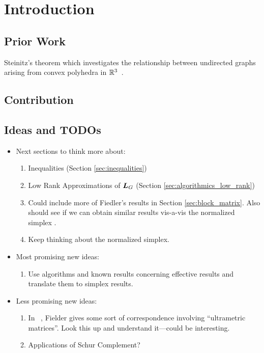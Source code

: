 \chapter{Introduction}
\label{chap:intro}



\section{Prior Work}
\label{chap:intro_prior_work}

Steinitz's theorem which investigates the relationship between undirected graphs arising from convex polyhedra in $\mathbb{R}^3$~\cite{steinitz1922polyeder}. 

\section{Contribution}
\label{chap:intro_contribution}


\section{Ideas and TODOs}
\begin{itemize}
	\item Next sections to think more about: 
	\begin{enumerate}
		\item Inequalities (Section \ref{sec:inequalities}) 
		\item Low Rank Approximations of $\vb*{L}_G$ (Section \ref{sec:algorithmics_low_rank})
		\item Could include more of Fiedler's results in Section \ref{sec:block_matrix}. Also should see if we can obtain  similar results vis-a-vis the normalized simplex . 
		\item Keep thinking about the normalized simplex. 
	\end{enumerate}
\item Most promising new ideas: 
\begin{enumerate}
	\item Use algorithms and known results concerning effective results and translate them to simplex results. 
\end{enumerate}
\item Less promising new ideas: 
\begin{enumerate}
	\item  In ~\cite{fiedler1998some}, Fielder gives some sort of correspondence involving ``ultrametric matrices''. Look this up and understand it---could be interesting. 
	\item Applications of Schur Complement? 
\end{enumerate}
\end{itemize}







     

  	
